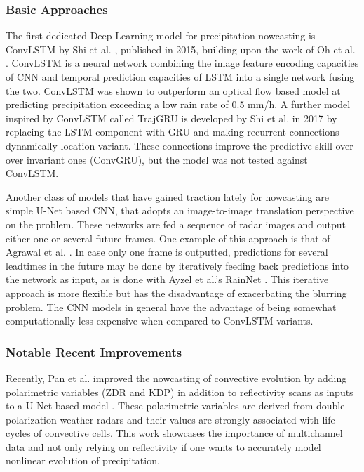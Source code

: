 \subsubsection*{Basic Approaches}
 
The first dedicated Deep Learning model for precipitation nowcasting is ConvLSTM by Shi et al. \cite{shi_convolutional_2015}, published in 2015, building upon the work of Oh et al. \cite{oh_action-conditional_2015}. ConvLSTM is a neural network combining the image feature encoding capacities of CNN and  temporal prediction capacities of LSTM into a single network fusing the two. ConvLSTM was shown to outperform an optical flow based model at predicting precipitation exceeding a low rain rate of 0.5 mm/h. 
A further model inspired by ConvLSTM called TrajGRU is developed by Shi et al. \cite{shi_deep_2017} in 2017 by replacing the LSTM component with GRU and making recurrent connections dynamically location-variant. These connections improve the predictive skill over over invariant ones (ConvGRU), but the model was not tested against ConvLSTM. 

Another class of models that have gained traction lately for nowcasting are simple U-Net based CNN, that adopts an image-to-image translation perspective on the problem. These networks are fed a sequence of radar images and output either one or several future frames. One example of this approach is  that of Agrawal et al. \cite{agrawal_machine_2019}. In case only one frame is outputted, predictions for several leadtimes in the future may be done by iteratively feeding back predictions into the network as input, as is done with Ayzel et al.'s RainNet \cite{ayzel_rainnet_nodate}. This iterative approach is more flexible but has the disadvantage of exacerbating the blurring problem. The CNN models in general have the advantage of being somewhat computationally less expensive when compared to ConvLSTM variants. 

\subsubsection*{Notable Recent Improvements}

Recently, Pan et al. improved the nowcasting of convective evolution by adding  polarimetric variables (ZDR and KDP) in addition to reflectivity scans as inputs to a U-Net based model \cite{pan_improving_2021}. These polarimetric variables are derived from double polarization weather radars and their values are strongly associated with life-cycles of convective cells. This work showcases the importance of multichannel data and not only relying on reflectivity if one wants to accurately model nonlinear evolution of precipitation.

